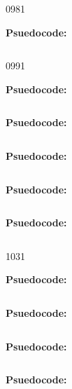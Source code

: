    {098}{1}

\textbf{Psuedocode:}
\begin{verbatim}
\end{verbatim}


   {099}{1}

\textbf{Psuedocode:}
\begin{verbatim}
\end{verbatim}



\textbf{Psuedocode:}
\begin{verbatim}
\end{verbatim}



\textbf{Psuedocode:}
\begin{verbatim}
\end{verbatim}



\textbf{Psuedocode:}
\begin{verbatim}
\end{verbatim}



\textbf{Psuedocode:}
\begin{verbatim}
\end{verbatim}


   {103}{1}

\textbf{Psuedocode:}
\begin{verbatim}
\end{verbatim}



\textbf{Psuedocode:}
\begin{verbatim}
\end{verbatim}



\textbf{Psuedocode:}
\begin{verbatim}
\end{verbatim}



\textbf{Psuedocode:}
\begin{verbatim}
\end{verbatim}


